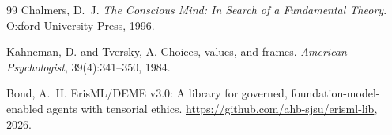 \documentclass[12pt,letterpaper]{article}
\theoremstyle{definition}
\theoremstyle{plain}
\begin{document}
\begin{thebibliography}{99}
Chalmers, D.~J.
\newblock \emph{The Conscious Mind: In Search of a Fundamental Theory}.
\newblock Oxford University Press, 1996.

Kahneman, D. and Tversky, A.
\newblock Choices, values, and frames.
\newblock \emph{American Psychologist}, 39(4):341--350, 1984.

Bond, A.~H.
\newblock ErisML/DEME v3.0: A library for governed, foundation-model-enabled agents with tensorial ethics.
\newblock \url{https://github.com/ahb-sjsu/erisml-lib}, 2026.

\end{thebibliography}
\end{document}
